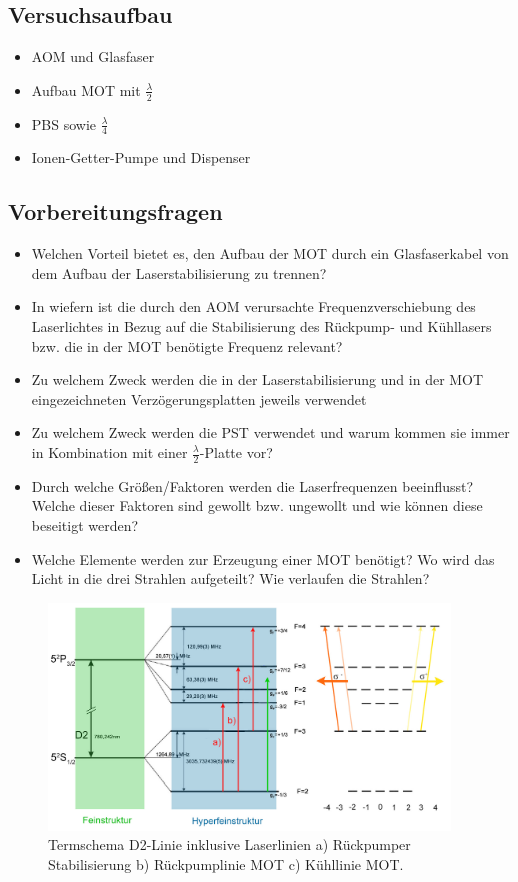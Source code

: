 \documentclass[10pt,a4paper]{extarticle}
\begin{document}
\subsection*{Versuchsaufbau}
\begin{itemize}
\item AOM und Glasfaser
\item Aufbau MOT mit $\frac{\lambda}{2}$
\item PBS sowie $\frac{\lambda}{4}$
\item Ionen-Getter-Pumpe und Dispenser
\end{itemize}

\subsection*{Vorbereitungsfragen}
\begin{itemize}
\item Welchen Vorteil bietet es, den Aufbau der MOT durch ein Glasfaserkabel von dem Aufbau der Laserstabilisierung zu trennen?
\item In wiefern ist die durch den AOM verursachte Frequenzverschiebung des Laserlichtes in Bezug auf die Stabilisierung des Rückpump- und Kühllasers bzw. die in der MOT benötigte Frequenz relevant?
\item Zu welchem Zweck werden die in der Laserstabilisierung und in der MOT eingezeichneten Verzögerungsplatten jeweils verwendet
\item Zu welchem Zweck werden die PST verwendet und warum kommen sie immer in Kombination mit einer $\frac{\lambda}{2}$-Platte vor?
\item Durch welche Größen/Faktoren werden die Laserfrequenzen beeinflusst? Welche dieser Faktoren sind gewollt bzw. ungewollt und wie können diese beseitigt werden?
\item Welche Elemente werden zur Erzeugung einer MOT benötigt? Wo wird das Licht in die drei Strahlen aufgeteilt? Wie verlaufen die Strahlen?
\end{itemize}

\begin{figure}[htb!]
	\centering
	\includegraphics[width = 0.95\textwidth]{TS_korrigiert.jpg}
	\caption{Termschema D2-Linie inklusive Laserlinien a) Rückpumper Stabilisierung b) Rückpumplinie MOT c) Kühllinie MOT.}
\end{figure}
\end{document}
